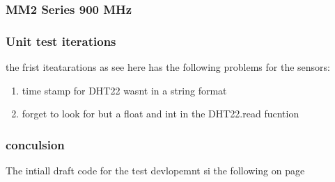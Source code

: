 \subsubsection{MM2 Series 900 MHz}
 
\subsubsection{Unit test iterations}
the frist iteatarations as see here has the following problems for the sensors:
\begin{enumerate}
    \item time stamp for DHT22 wasnt in a string format 
    \item forget to look for but a float and int  in the  DHT22.read fucntion
\end{enumerate}
\subsubsection{conculsion}
The  intiall  draft  code  for  the  test  devlopemnt  si the  following
on page 